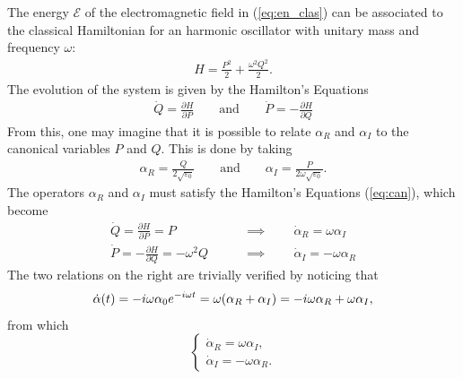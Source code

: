 The energy $\mathcal{E}$ of the electromagnetic field in (\ref{eq:en_clas}) can be associated to the classical Hamiltonian for an harmonic oscillator with unitary mass and frequency $\omega$:
\begin{align}
    H = \frac{P^2}{2} + \frac{\omega^2 Q^2}{2}.
\end{align}
The evolution of the system is given by the Hamilton's Equations 
\begin{align}
    \dot{Q} =\frac{\partial H}{\partial P} \qquad \text{and} \qquad \dot{P} =-\frac{\partial H}{\partial Q}
    \label{eq:can}
\end{align}
From this, one may imagine that it is possible to relate $\alpha_R$ and $\alpha_I$ to the canonical variables $P$ and $Q$. This is done by taking 
\begin{align}
    \alpha_R = \frac{Q}{2 \sqrt{\varepsilon_0}} \qquad \text{and} \qquad \alpha_I = \frac{P}{2 \omega \sqrt{\varepsilon_0}}. 
    \label{eq:cooandop}
\end{align}
The operators $\alpha_R$ and $\alpha_I$ must satisfy the Hamilton's Equations (\ref{eq:can}), which become
\begin{align*}
    \dot{Q} = \frac{\partial H}{\partial P} = P \qquad &\implies \qquad  \dot{\alpha}_R = \omega   \alpha_I \\
    \dot{P} = -\frac{\partial H}{\partial Q} = -\omega^2 Q \qquad &\implies \qquad \dot{\alpha}_I = - \omega \alpha_R
\end{align*}
The two relations on the right are trivially verified by noticing that 
\begin{align*}
    \dot{\alpha}(t) = -i\omega \alpha_0 e^{-i\omega t} = \- \omega (\alpha_R + \alpha_I) = -i\omega \alpha_R + \omega \alpha_I, 
\end{align*}
from which
\begin{equation}
    \begin{cases}
        \dot{\alpha}_{R}=\omega\alpha_{I},\\
        \dot{\alpha}_{I}=-\omega\alpha_{R}.
    \end{cases}
\end{equation}


